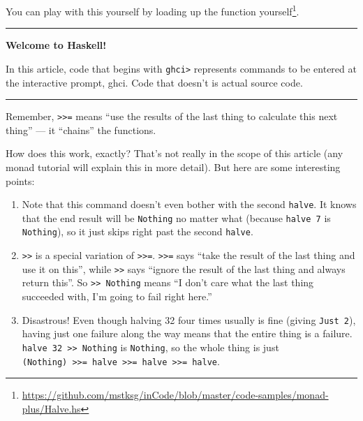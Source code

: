 \documentclass[]{article}
\renewcommand{\href}[2]{#2\footnote{\url{#1}}}
\begin{document}
You can play with this yourself by
\href{https://github.com/mstksg/inCode/blob/master/code-samples/monad-plus/Halve.hs}{loading
up the function yourself}.

\begin{center}\rule{0.5\linewidth}{\linethickness}\end{center}

\textbf{Welcome to Haskell!}

In this article, code that begins with \texttt{ghci\textgreater{}} represents
commands to be entered at the interactive prompt, ghci. Code that doesn't is
actual source code.

\begin{center}\rule{0.5\linewidth}{\linethickness}\end{center}

Remember, \texttt{\textgreater{}\textgreater{}=} means ``use the results of the
last thing to calculate this next thing'' --- it ``chains'' the functions.

How does this work, exactly? That's not really in the scope of this article (any
monad tutorial will explain this in more detail). But here are some interesting
points:

\begin{enumerate}
\def\labelenumi{\arabic{enumi}.}
\tightlist
\item
  Note that this command doesn't even bother with the second \texttt{halve}. It
  knows that the end result will be \texttt{Nothing} no matter what (because
  \texttt{halve\ 7} is \texttt{Nothing}), so it just skips right past the second
  \texttt{halve}.
\item
  \texttt{\textgreater{}\textgreater{}} is a special variation of
  \texttt{\textgreater{}\textgreater{}=}. \texttt{\textgreater{}\textgreater{}=}
  says ``take the result of the last thing and use it on this'', while
  \texttt{\textgreater{}\textgreater{}} says ``ignore the result of the last
  thing and always return this''. So
  \texttt{\textgreater{}\textgreater{}\ Nothing} means ``I don't care what the
  last thing succeeded with, I'm going to fail right here.''
\item
  Disastrous! Even though halving 32 four times usually is fine (giving
  \texttt{Just\ 2}), having just one failure along the way means that the entire
  thing is a failure. \texttt{halve\ 32\ \textgreater{}\textgreater{}\ Nothing}
  is \texttt{Nothing}, so the whole thing is just
  \texttt{(Nothing)\ \textgreater{}\textgreater{}=\ halve\ \textgreater{}\textgreater{}=\ halve\ \textgreater{}\textgreater{}=\ halve}.
\end{enumerate}
\end{document}
